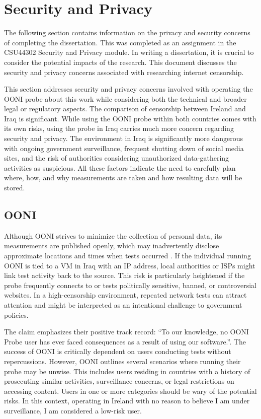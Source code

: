 \chapter{Security and Privacy}

The following section contains information on the privacy and security
concerns of completing the dissertation. This was completed as an assignment in the CSU44302 Security and Privacy module. In writing a dissertation, it is crucial to consider the potential impacts of the research. This document discusses the security and privacy concerns associated with researching internet censorship.

This section addresses security and privacy concerns involved with operating the OONI probe about this work while considering both the technical and broader legal or regulatory aspects. The comparison of censorship between Ireland and Iraq is significant. While using the OONI probe within both countries comes with its own risks, using the probe in Iraq carries much more concern regarding security and privacy. The environment in Iraq is significantly more dangerous with ongoing government surveillance, frequent shutting down of social media sites, and the risk of authorities considering unauthorized data-gathering activities as suspicious. All these factors indicate the need to carefully plan where, how, and why measurements are taken and how resulting data will be stored.

\section{OONI}

Although OONI strives to minimize the collection of personal data, its measurements are published openly, which may inadvertently disclose approximate locations and times when tests occurred \cite{ooniOONIPrivacyAndSecurity}. If the individual running OONI is tied to a VM in Iraq with an IP address, local authorities or ISPs might link test activity back to the source. This risk is particularly heightened if the probe frequently connects to or tests politically sensitive, banned, or controversial websites. In a high-censorship environment, repeated network tests can attract attention and might be interpreted as an intentional challenge to government policies.

The claim emphasizes their positive track record: “To our knowledge, no OONI Probe user has ever faced consequences as a result of using our software.”\cite{ooniOONIPrivacyAndSecurity}. The success of OONI is critically dependent on users conducting tests without repercussions. However, OONI outlines several scenarios where running their probe may be unwise. This includes users residing in countries with a history of prosecuting similar activities, surveillance concerns, or legal restrictions on accessing content. Users in one or more categories should be wary of the potential
risks. In this context, operating in Ireland with no reason to believe I am under surveillance, I am considered a low-risk user.

